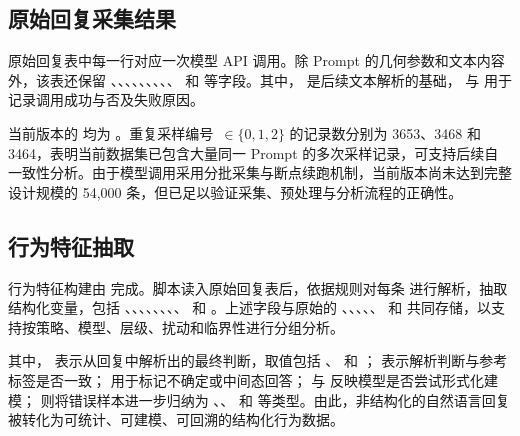 \subsection{原始回复采集结果}

原始回复表中每一行对应一次模型 API 调用。除 Prompt 的几何参数和文本内容外，该表还保留 、、、、、、、、、 和  等字段。其中， 是后续文本解析的基础， 与  用于记录调用成功与否及失败原因。

当前版本的  均为 。重复采样编号 \,$\in\{0,1,2\}$ 的记录数分别为 3653、3468 和 3464，表明当前数据集已包含大量同一 Prompt 的多次采样记录，可支持后续自一致性分析。由于模型调用采用分批采集与断点续跑机制，当前版本尚未达到完整设计规模的 54{,}000 条，但已足以验证采集、预处理与分析流程的正确性。

\subsection{行为特征抽取}

行为特征构建由  完成。脚本读入原始回复表后，依据规则对每条  进行解析，抽取结构化变量，包括 、、、、、、、、 和 。上述字段与原始的 、、、、、 和  共同存储，以支持按策略、模型、层级、扰动和临界性进行分组分析。

其中， 表示从回复中解析出的最终判断，取值包括 、 和 ； 表示解析判断与参考标签是否一致； 用于标记不确定或中间态回答； 与  反映模型是否尝试形式化建模； 则将错误样本进一步归纳为 、、 和  等类型。由此，非结构化的自然语言回复被转化为可统计、可建模、可回溯的结构化行为数据。

